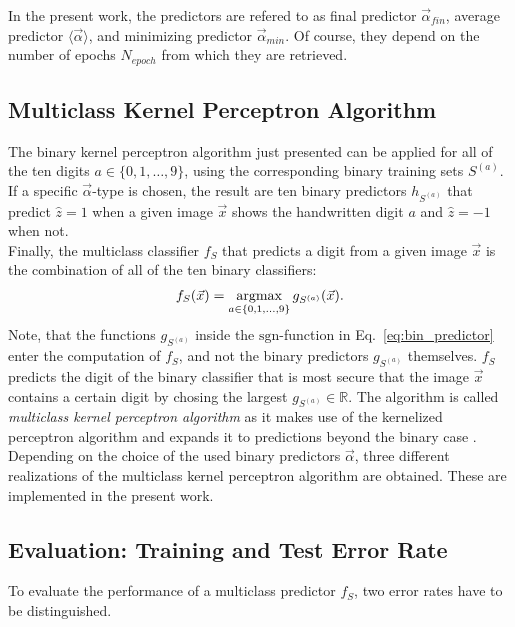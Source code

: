 In the present work, the predictors are refered to as final predictor $\vec{\alpha}_{fin}$, average predictor $\langle \vec{\alpha} \rangle$, and minimizing predictor $\vec{\alpha}_{min}$. Of course, they depend on the number of epochs $N_{epoch}$ from which they are retrieved.

\subsection{Multiclass Kernel Perceptron Algorithm}

The binary kernel perceptron algorithm just presented can be applied for all of the ten digits $a \in \{0, 1, \dots, 9\}$, using the corresponding binary training sets $S^{(a)}$. If a specific $\vec{\alpha}$-type is chosen, the result are ten binary predictors $h_{S^{(a)}}$ that predict $\hat{z} = 1$ when a given image $\vec{x}$ shows the handwritten digit $a$ and $\hat{z} = -1$ when not. \\

Finally, the multiclass classifier $f_S$ that predicts a digit from a given image $\vec{x}$ is the combination of all of the ten binary classifiers:
\begin{align*}
	f_S(\vec{x}) = \operatorname*{argmax}_{a \in \{0, 1, \dots, 9\}} g_{S^{(a)}}(\vec{x}).
\end{align*}
Note, that the functions $g_{S^{(a)}}$ inside the $\mathrm{sgn}$-function in Eq.~\ref{eq:bin_predictor} enter the computation of $f_S$, and not the binary predictors $g_{S^{(a)}}$ themselves.
$f_S$ predicts the digit of the binary classifier that is most secure that the image $\vec{x}$ contains a certain digit by chosing the largest $g_{S^{(a)}}\in\mathbb{R}$. The algorithm is called \textit{multiclass kernel perceptron algorithm} as it makes use of the kernelized perceptron algorithm and expands it to predictions beyond the binary case \cite{multiclass2005}. Depending on the choice of the used binary predictors $\vec{\alpha}$, three different realizations of the multiclass kernel perceptron algorithm are obtained. These are implemented in the present work.

\subsection{Evaluation: Training and Test Error Rate}

To evaluate the performance of a multiclass predictor $f_S$, two error rates have to be distinguished. 

